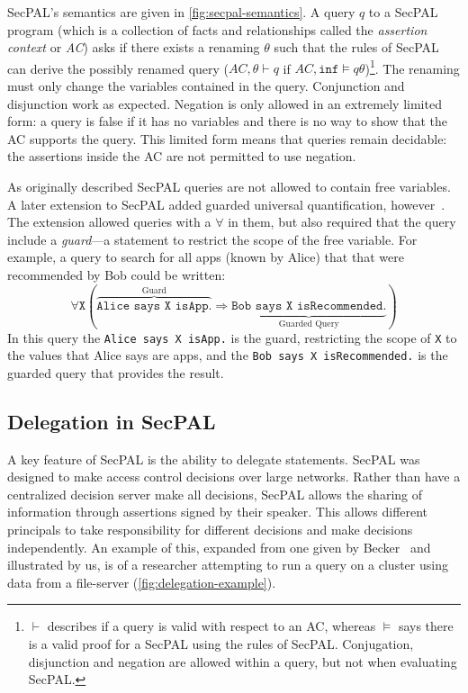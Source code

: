 \documentclass[thesis.tex]{subfiles}
\begin{document}
SecPAL's semantics are given in \autoref{fig:secpal-semantics}.  A
query $q$ to a SecPAL program (which is a collection of facts and
relationships called the \emph{assertion context} or \emph{AC}) asks
if there exists a renaming $\theta$ such that the rules of SecPAL can
derive the possibly renamed query ($AC,\theta \vdash q$
if $AC,\texttt{inf} \models q\theta$)\footnote{$\vdash$ describes if a query
  is valid with respect to an AC, whereas $\models$ says there is a
  valid proof for a SecPAL using the rules of SecPAL.  Conjugation,
  disjunction and negation are allowed within a query, but not when
  evaluating SecPAL.}.  The renaming must only change 
the variables contained in the query. Conjunction and disjunction work
as expected.  Negation is only allowed in an extremely limited form: a
query is false if it has no variables and there is no way
to show that the AC supports the query.  This limited form means that
queries remain decidable: the assertions inside the AC are not permitted to
use negation. 
 
As originally described SecPAL queries are not allowed to contain free variables.
A later extension to SecPAL added guarded universal quantification, however~\cite{moritz_y_becker_secpal:_2009}. 
The extension allowed queries with a $\forall$ in them, but also required that the query include a \emph{guard}---a statement to restrict the scope of the free variable.
For example, a query to search for all apps (known by Alice) that that were recommended by Bob could be written:
\begin{equation*}
  \forall \mathtt{X}\left( \overbrace{\texttt{Alice says X isApp.}}^{\text{Guard}} \Rightarrow \underbrace{\texttt{Bob says X isRecommended.}}_{\text{Guarded Query}}\right)
\end{equation*}
In this query the \texttt{Alice says X isApp.} is the guard, restricting the scope of \texttt{X} to 
the values that Alice says are apps, and the \texttt{Bob says X isRecommended.} is the guarded query that provides the result.

\subsection{Delegation in SecPAL}
\label{ssec:delegation_in_secpal}

A key feature of SecPAL is the ability to delegate statements. SecPAL was
designed to make access control decisions over large networks. Rather than have
a centralized decision server make all decisions, SecPAL allows
the sharing of information through assertions signed by their speaker. This allows
different principals to take responsibility for different decisions and make
decisions independently. An example of this, expanded from one given by
Becker~\cite{becker_secpal:_2006} and illustrated by us, is of a
researcher attempting to run a query on a cluster using data from a file-server
(\autoref{fig:delegation-example}).
\end{document}
